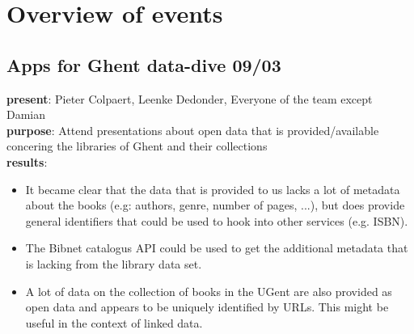 \chapter{Overview of events}
\section{Apps for Ghent data-dive 09/03}
{\bf present}: Pieter Colpaert, Leenke Dedonder, Everyone of the team except Damian\\
{\bf purpose}: Attend presentations about open data that is provided/available concering the libraries of Ghent and their collections\\
{\bf results}:
\begin{itemize}
  \item It became clear that the data that is provided to us lacks a lot of metadata about the books (e.g: authors, genre, number of pages, ...), but does provide general identifiers that could be used to hook into other services (e.g. ISBN).
  \item The Bibnet catalogus API could be used to get the additional metadata that is lacking from the library data set.
  \item A lot of data on the collection of books in the UGent are also provided as open data and appears to be uniquely identified by URLs. This might be useful in the context of linked data.
\end{itemize}

